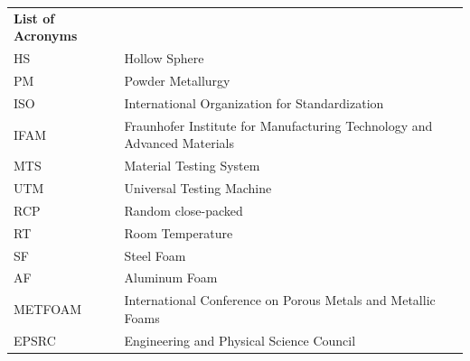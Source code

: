 \documentclass[review]{elsarticle}
\begin{document}
{\begin{table}[htbp]
	\begin{tabular}{ll}
		\textbf{List of Acronyms} \\
		HS    & Hollow Sphere \\
		PM    & Powder Metallurgy \\
		ISO   & International Organization for Standardization \\
		IFAM  & Fraunhofer Institute for Manufacturing Technology and Advanced Materials \\
		MTS   & Material Testing System \\
		UTM   & Universal Testing Machine \\
		RCP   & Random close-packed \\
		RT    & Room Temperature \\
		SF    & Steel Foam \\
		AF    & Aluminum Foam \\
		METFOAM & International Conference on Porous Metals and Metallic Foams \\
		EPSRC & Engineering and Physical Science Council
	\end{tabular}%
\end{table}%

\FloatBarrier

\renewcommand{\nomname}{List of Symbols}






}
\end{document}
